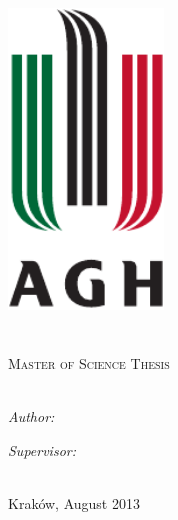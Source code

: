 \documentclass[11pt, a4paper]{Thesis} %
\begin{document}
\begin{titlepage}
\begin{center}

\textsc{\LARGE \univname}\\[1.5cm] %

\includegraphics[height=8cm]{Logo} %
\\[1.5cm]
\facname\\\deptname\\[2cm] %


\textsc{\Large Master of Science Thesis}\\[1.5cm] %


{\huge \bfseries \ttitle}\\ [1.5cm] %
 
\begin{minipage}{0.4\textwidth}
\begin{flushleft} \large
\emph{Author:}\\
\authornames %
\end{flushleft}
\end{minipage}
\begin{minipage}{0.4\textwidth}
\begin{flushright} \large
\emph{Supervisor:} \\
\supname %
\end{flushright}
\end{minipage}\\[1.0cm]
 
{\large Kraków, August 2013}
 
\vfill
\end{center}

\end{titlepage}
\end{document}
